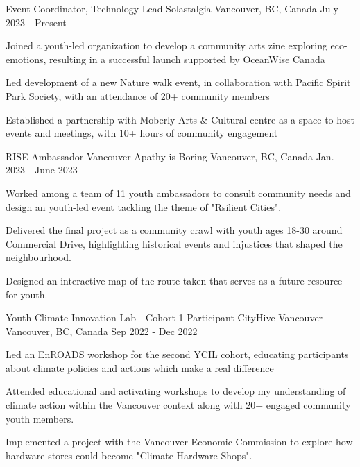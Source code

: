 \begin{cventries}
  \cventry
    {Event Coordinator, Technology Lead}
    {Solastalgia}
    {Vancouver, BC, Canada}
    {July 2023 - Present}
    {
      \begin{cvitems}
        \item Joined a youth-led organization to develop a community arts zine exploring eco-emotions, resulting in a successful launch supported by OceanWise Canada
        \item Led development of a new Nature walk event, in collaboration with Pacific Spirit Park Society, with an attendance of 20+ community members
        \item Established a partnership with Moberly Arts \& Cultural centre as a space to host events and meetings, with 10+ hours of community engagement
      \end{cvitems}
    }
  \cventry
    {RISE Ambassador Vancouver}
    {Apathy is Boring}
    {Vancouver, BC, Canada}
    {Jan. 2023 - June 2023}
    {
      \begin{cvitems}
        \item Worked among a team of 11 youth ambassadors to consult community needs and design an youth-led event tackling the theme of "Rsilient Cities".
        \item Delivered the final project as a community crawl with youth ages 18-30 around Commercial Drive, highlighting historical events and injustices that shaped the neighbourhood.
        \item Designed an interactive map of the route taken that serves as a future
        resource for youth.
      \end{cvitems}
    }
  \cventry
    {Youth Climate Innovation Lab - Cohort 1 Participant}
    {CityHive Vancouver}
    {Vancouver, BC, Canada}
    {Sep 2022 - Dec 2022}
    {
      \begin{cvitems}
        \item Led an EnROADS workshop for the second YCIL cohort, educating
        participants about climate policies and actions which make a real difference
        \item Attended educational and activating workshops to develop my understanding of climate action within the Vancouver context along with
        20+ engaged community youth members.
        \item Implemented a project with the Vancouver Economic Commission to explore how hardware stores could become "Climate Hardware Shops".

\end{cvitems}}
\end{cventries}
